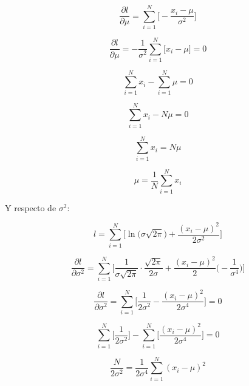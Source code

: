 \documentclass[a4paper,10pt]{article}
\begin{document}
\begin{equation*}
\frac{\partial l}{\partial \mu} = \sum_{i = 1}^{N} \Big[ -\frac{x_i - \mu}{\sigma^2} \Big]
\end{equation*}

\begin{equation*}
\frac{\partial l}{\partial \mu} = -\frac{1}{\sigma^2}\sum_{i = 1}^{N} \Big[ x_i - \mu \Big] = 0
\end{equation*}

\begin{equation*}
\sum_{i = 1}^{N} x_i - \sum_{i = 1}^{N} \mu = 0
\end{equation*}

\begin{equation*}
\sum_{i = 1}^{N} x_i - N\mu = 0
\end{equation*}

\begin{equation*}
\sum_{i = 1}^{N} x_i = N\mu
\end{equation*}

\begin{equation*}
\mu = \frac{1}{N}\sum_{i = 1}^{N} x_i
\end{equation*}

Y respecto de $\sigma^2$:

\begin{equation*}
  l = \sum_{i = 1}^{N} \Big[ \ln \big( \sigma\sqrt{2\pi} \big) + \frac{(x_i - \mu)^2}{2\sigma^2} \Big]
\end{equation*}

\begin{equation*}
  \frac{\partial l}{\partial \sigma^2} = \sum_{i = 1}^{N} \Big[ \frac{1}{\sigma\sqrt{2\pi}} \cdot \frac{\sqrt{2\pi}}{2\sigma} + \frac{(x_i - \mu)^2}{2} \big( -\frac{1}{\sigma^4} \big) \Big]
\end{equation*}

\begin{equation*}
  \frac{\partial l}{\partial \sigma^2} = \sum_{i = 1}^{N} \Big[ \frac{1}{2\sigma^2} - \frac{(x_i - \mu)^2}{2\sigma^4} \Big] = 0
\end{equation*}

\begin{equation*}
\sum_{i = 1}^{N} \Big[ \frac{1}{2\sigma^2} \Big] - \sum_{i = 1}^{N} \Big[\frac{(x_i - \mu)^2}{2\sigma^4} \Big] = 0
\end{equation*}

\begin{equation*}
\frac{N}{2\sigma^2} = \frac{1}{2\sigma^4}\sum_{i = 1}^{N} (x_i - \mu)^2
\end{equation*}
\end{document}
